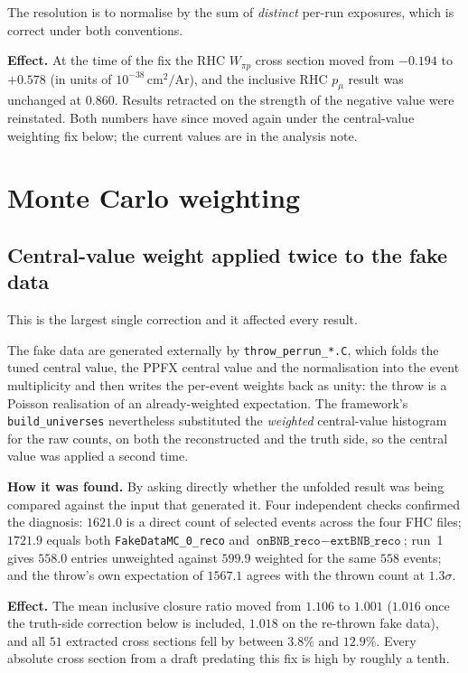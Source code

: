 The resolution is to normalise by the sum of \emph{distinct} per-run exposures, which is
correct under both conventions.

\textbf{Effect.} At the time of the fix the RHC $W_{\pi p}$ cross section moved from
$-0.194$ to $+0.578$ (in units of $10^{-38}\,\mathrm{cm}^2/\mathrm{Ar}$), and the
inclusive RHC $p_\mu$ result was unchanged at $0.860$.  Results retracted on the strength
of the negative value were reinstated.  Both numbers have since moved again under the
central-value weighting fix below; the current values are in the analysis note.

\section{Monte Carlo weighting}

\subsection{Central-value weight applied twice to the fake data}

This is the largest single correction and it affected every result.

The fake data are generated externally by \texttt{throw\_perrun\_*.C}, which folds the
tuned central value, the PPFX central value and the normalisation into the event
multiplicity and then writes the per-event weights back as unity: the throw is a
Poisson realisation of an already-weighted expectation.  The framework's
\texttt{build\_universes} nevertheless substituted the \emph{weighted} central-value
histogram for the raw counts, on both the reconstructed and the truth side, so the
central value was applied a second time.

\textbf{How it was found.} By asking directly whether the unfolded result was being
compared against the input that generated it.  Four independent checks confirmed the
diagnosis: $1621.0$ is a direct count of selected events across the four FHC files;
$1721.9$ equals both \texttt{FakeDataMC\_0\_reco} and
$\texttt{onBNB\_reco}-\texttt{extBNB\_reco}$; run~1 gives $558.0$ entries unweighted
against $599.9$ weighted for the same $558$ events; and the throw's own expectation of
$1567.1$ agrees with the thrown count at $1.3\sigma$.

\textbf{Effect.} The mean inclusive closure ratio moved from $1.106$ to $1.001$ ($1.016$ once the truth-side correction below is included, $1.018$ on the re-thrown fake data), and all
$51$ extracted cross sections fell by between $3.8\%$ and $12.9\%$.  Every absolute cross
section from a draft predating this fix is high by roughly a tenth.

